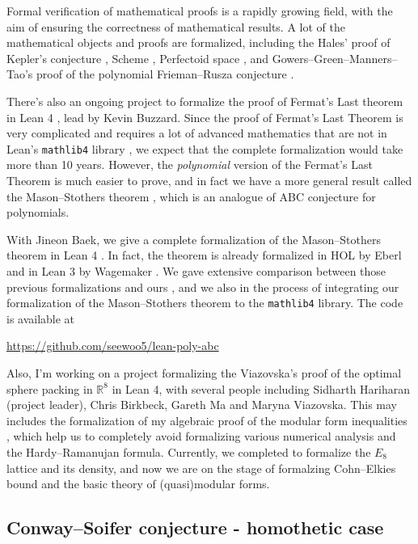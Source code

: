 \documentclass[12pt]{article}
\begin{document}
Formal verification of mathematical proofs is a rapidly growing field, with the aim of ensuring the correctness of mathematical results.
A lot of the mathematical objects and proofs are formalized, including the Hales' proof of Kepler's conjecture \cite{hales2017formal}, Scheme \cite{buzzard2022schemes}, Perfectoid space \cite{buzzard2020formalising}, and Gowers--Green--Manners--Tao's proof of the polynomial Frieman--Rusza conjecture \cite{gowers2023conjecture,pfr}.

There's also an ongoing project to formalize the proof of Fermat's Last theorem in Lean 4 \cite{fltlean4}, lead by Kevin Buzzard.
Since the proof of Fermat's Last Theorem is very complicated and requires a lot of advanced mathematics that are not in Lean's \texttt{mathlib4} library \cite{mathlib4}, we expect that the complete formalization would take more than 10 years.
However, the \emph{polynomial} version of the Fermat's Last Theorem is much easier to prove, and in fact we have a more general result called the Mason--Stothers theorem \cite{stothers81,mason84}, which is an analogue of ABC conjecture for polynomials.

With Jineon Baek, we give a complete formalization of the Mason--Stothers theorem in Lean 4 \cite{baek2024formalizing}.
In fact, the theorem is already formalized in HOL by Eberl \cite{eberl17} and in Lean 3 by Wagemaker \cite{wagemaker18}.
We gave extensive comparison between those previous formalizations and ours \cite[Section 7]{baek2024formalizing}, and we also in the process of integrating our formalization of the Mason--Stothers theorem to the \texttt{mathlib4} library.
The code is available at
\begin{center}
    \url{https://github.com/seewoo5/lean-poly-abc}
\end{center}

Also, I'm working on a project formalizing the Viazovska's \cite{viazovska2017sphere} proof of the optimal sphere packing in $\mathbb{R}^{8}$ in Lean 4, with several people including Sidharth Hariharan (project leader), Chris Birkbeck, Gareth Ma and Maryna Viazovska.
This may includes the formalization of my algebraic proof of the modular form inequalities \cite{lee2024algebraic}, which help us to completely avoid formalizing  various numerical analysis and the Hardy--Ramanujan formula.
Currently, we completed to formalize the $E_8$ lattice and its density, and now we are on the stage of formalzing Cohn--Elkies bound and the basic theory of (quasi)modular forms.


\subsection*{Conway--Soifer conjecture - homothetic case}
\end{document}
